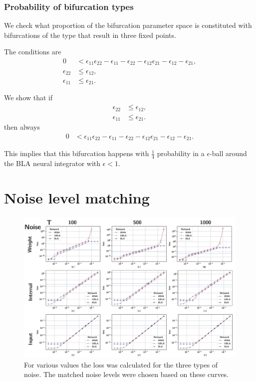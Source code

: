\documentclass{article} %
\newcounter{ct}
\theoremstyle{definition}
\theoremstyle{remark}
\begin{document}
\subsubsection{Probability of bifurcation types}
We check what proportion of the bifurcation parameter space is constituted with bifurcations of the type that result in three fixed points.

The conditions are 
\begin{align*}
0 &< \epsilon_{11}\epsilon_{22}-\epsilon_{11}-\epsilon_{22}-\epsilon_{12}\epsilon_{21}-\epsilon_{12}-\epsilon_{21},\\
\epsilon_{22} &\leq \epsilon_{12},\\
\epsilon_{11} &\leq \epsilon_{21}.
\end{align*}


We show that if 
\begin{align*}
\epsilon_{22} &\leq \epsilon_{12},\\
\epsilon_{11} &\leq \epsilon_{21}.
\end{align*}
then always 
\begin{align*}
0 &< \epsilon_{11}\epsilon_{22}-\epsilon_{11}-\epsilon_{22}-\epsilon_{12}\epsilon_{21}-\epsilon_{12}-\epsilon_{21}.
\end{align*}


This implies that this bifurcation happens with $\frac{1}{4}$ probability in a $\epsilon$-ball around the BLA neural integrator with $\epsilon<1$.



\section{Noise level matching}\label{sec:supp:matching}

\begin{figure}[H]
     \centering
    \includegraphics[width=\textwidth]{matching_noise_3types_cont}
       \caption{For various values the loss was calculated for the three types of noise. The matched noise levels were chosen based on these curves.}
         \label{fig:matching_noise_3types_cont}
\end{figure}
\end{document}
